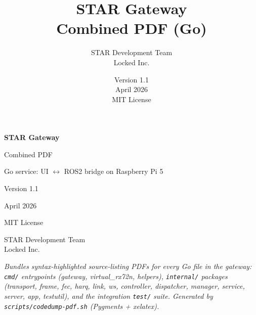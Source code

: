 \documentclass[11pt,letterpaper]{article}
\title{\Huge\bfseries STAR Gateway\\[0.4em]\Large Combined PDF (Go)}
\author{STAR Development Team \\ Locked Inc.}
\date{Version 1.1 \\ April 2026 \\ MIT License}
\begin{document}
\begin{titlepage}
\centering
\vspace*{2.5cm}

{\Huge\bfseries STAR Gateway\par}
\vspace{0.3cm}
{\LARGE Combined PDF\par}
\vspace{0.3cm}
{\large Go service: UI $\leftrightarrow$ ROS2 bridge on Raspberry Pi 5\par}

\vfill

{\large Version 1.1\par}
{\large April 2026\par}
\vspace{0.4cm}
{\large MIT License\par}

\vfill

{\normalsize STAR Development Team\\Locked Inc.\par}
\vspace{0.8cm}

{\small\itshape Bundles syntax-highlighted source-listing PDFs for every
Go file in the gateway: \texttt{cmd/} entrypoints (gateway, virtual\_rx72n,
helpers), \texttt{internal/} packages (transport, frame, fec, harq, link,
ws, controller, dispatcher, manager, service, server, app, testutil),
and the integration \texttt{test/} suite. Generated by
\texttt{scripts/codedump-pdf.sh} (Pygments + xelatex).\par}
\end{titlepage}

\tableofcontents
\newpage






\end{document}
